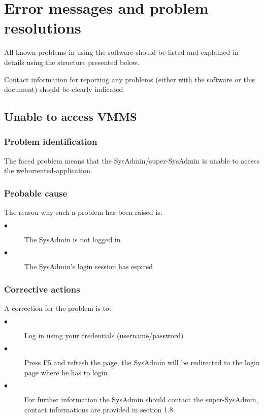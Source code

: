
\chapter{Error messages and problem resolutions}
\label{chap:error_messages}

All known problems in using the software should be listed and explained in
details using the structure presented below.

Contact information for reporting any problems (either with the software or
this document) should be clearly indicated


\section{Unable to access VMMS} 

\subsection{Problem identification}
The faced problem means that the SysAdmin/super-SysAdmin is unable to access the weboriented-application.

\subsection{Probable cause}

The reason why such a problem has been raised is:\\
\begin{description}
  \item[$\bullet$] The SysAdmin is not logged in
  \item[$\bullet$] The SysAdmin's login session has espired
\end{description}


\subsection{Corrective actions}

A correction for the problem is to:\\
\begin{description}
  \item[$\bullet$] Log in using your credentials (username/password)
  \item[$\bullet$] Press F5 and refresh the page, the SysAdmin will be redirected to
  the login page where he has to login
  \item[$\bullet$] For further information the SysAdmin should contact the
  super-SysAdmin, contact informations are provided in section 1.8
\end{description}







